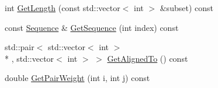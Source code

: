 \begin{DoxyCompactItemize}
\item 
int \hyperlink{class_c_o_n_t_r_a_l_i_g_n_1_1_multi_sequence_ae974fd25f36b1c7b826373e5311e7df8}{Get\+Length} (const std\+::vector$<$ int $>$ \&subset) const 
\item 
const \hyperlink{class_c_o_n_t_r_a_l_i_g_n_1_1_sequence}{Sequence} \& \hyperlink{class_c_o_n_t_r_a_l_i_g_n_1_1_multi_sequence_a5418c9c34fde46833954d10aa4b44238}{Get\+Sequence} (int index) const 
\item 
std\+::pair$<$ std\+::vector$<$ int $>$\\*
, std\+::vector$<$ int $>$ $>$ \hyperlink{class_c_o_n_t_r_a_l_i_g_n_1_1_multi_sequence_a5ef64b62dc8abdb0f1b3a4257551845f}{Get\+Aligned\+To} () const 
\item 
double \hyperlink{class_c_o_n_t_r_a_l_i_g_n_1_1_multi_sequence_a33f9b701d1ac5a1594d7e3fd84d3a372}{Get\+Pair\+Weight} (int i, int j) const 
\end{DoxyCompactItemize}


